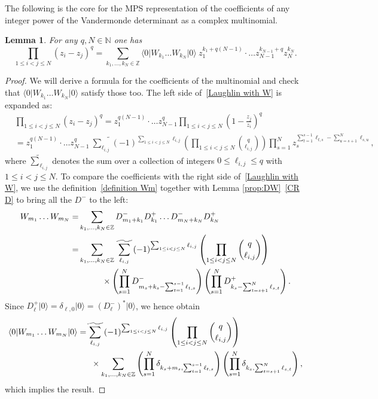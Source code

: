\documentclass[letterpaper, DIV=17]{scrartcl}
\newtheorem{lemma}[theorem]{Lemma}
\numberwithin{equation}{section}
\theoremstyle{definition}
\begin{document}
		
		The following is the core for the MPS representation of the coefficients of any integer power of the Vandermonde determinant as a complex multinomial. 
		\begin{lemma} \label{thm:MPS Laughlin}
			For any $ q, N  \in \mathbb{N} $ one has
			\begin{equation} \label{Laughlin with W}
				\prod_{1\leq i < j \leq N} (z_i-z_j)^q = \sum_{k_1, \dots, k_N \in \mathbb{Z}} \langle 0 \vert W_{k_1} \dots W_{k_N} \vert 0 \rangle \ z_1^{k_1+q(N-1)}\cdot \dots z_{N-1}^{k_{N-1} +q} z_N^{k_N}.
			\end{equation}

					\end{lemma}
\begin{proof}
We will derive a formula for the coefficients of the multinomial and check that $\langle 0\vert W_{k_1} \dots W_{k_N} \vert 0\rangle$ satisfy those too.		
The left side of~\eqref{Laughlin with W} is expanded as:
			\begin{align*}
				&\prod_{1\leq i < j \leq N} (z_i-z_j)^q 
				= z_1^{q(N-1)} \cdot \dots z_{N-1}^q \prod_{1\leq i < j \leq N} \left( 1-\frac{z_j}{z_i} \right)^q \\
				&= z_1^{q(N-1)} \cdot \dots z_{N-1}^q \ \widetilde{\sum_{\ell_{i,j}}} (-1)^{\sum_{1\leq i<j \leq N} \ell_{i,j}} \left( \prod_{1\leq i < j \leq N} \binom{q}{\ell_{i,j}} \right) \prod_{s=1}^N z_s^{\sum_{t=1}^{s-1}\ell_{t,s} -\sum_{u=s+1}^{N} \ell_{s,u}},
			\end{align*}
			where $\widetilde{\sum}_{\ell_{i,j}}$ denotes the sum over a collection of integers $0\leq \ell_{i,j}\leq q$ with $1\leq i<j \leq N$. 
			To compare the coefficients with the right side of~\eqref{Laughlin with W}, 
			we use the definition~\eqref{definition Wm} together with Lemma \ref{prop:DW}~\eqref{CR D} to bring all the $D^-$ to the left:
			\begin{align*}
				 W_{m_1} \dots W_{m_N}   = & \sum_{k_1, \dots, k_N \in \mathbb{Z}} D_{m_1+k_1}^- D_{k_1}^+ \dots D_{m_N+k_N}^- D_{k_N}^+ \\
				= & \sum_{k_1, \dots, k_N \in \mathbb{Z}} \ \widetilde{\sum_{\ell_{i,j}}} \ (-1)^{\sum_{1\leq i<j \leq N} \ell_{i,j}}  \left( \prod_{1\leq i < j \leq N} \binom{q}{\ell_{i,j}} \right)  \\
				& \mkern50mu  \times  \left( \prod_{s=1}^N D^-_{m_s+k_s-\sum_{t=1}^{s-1} \ell_{t,s}} \right) \left( \prod_{s=1}^N D^+_{k_s-\sum_{t=s+1}^N \ell_{s,t}} \right) .
			\end{align*}
			Since $	D_\ell^+ \vert 0 \rangle = \delta_{\ell, 0} \vert 0 \rangle =(D_\ell^-)^* \vert 0\rangle $, 
			 we hence obtain
			\begin{align*}
			 \langle 0 \vert W_{m_1} \dots W_{m_N} \vert 0\rangle  =&\  \widetilde{\sum_{\ell_{i,j}}} \ (-1)^{\sum_{1\leq i<j \leq N} \ell_{i,j}} \left( \prod_{1\leq i < j \leq N} \binom{q}{\ell_{i,j}} \right)   \\
								&\mkern10mu  \times  \sum_{k_1, \dots, k_N \in \mathbb{Z}} \left(\prod_{s=1}^N \delta_{k_s+m_s,\sum_{t=1}^{s-1} \ell_{t,s}} \right) \left( \prod_{s=1}^N \delta_{k_s, \sum_{t=s+1}^N \ell_{s,t}} \right) ,
			\end{align*}
			which implies the result.
\end{proof}
\end{document}
